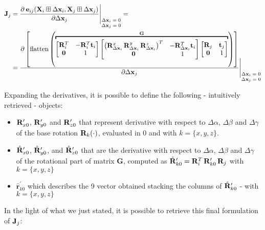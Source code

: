 \begin{align*}
    \jacob_j &= \frac{\partial\: \error_{ij}(\SState_i \boxplus \dx_i, \SState_j \boxplus \dx_j)}{\partial \dx_j} \Bigg \rvert_{\scriptsize\begin{matrix} \dx_i = 0\\\dx_j = 0\end{matrix}} = \\
    &= \frac{\partial \left[\flatten{\overbracket{\begin{bmatrix}\rot_i^T & -\rot_i^T \trans_i \\\zero & 1\end{bmatrix} \begin{bmatrix}\left(\rot_{\dx_i}^x \, \rot_{\dx_i}^y \, \rot_{\dx_i}^z\right)^T & -\rot_{\dx_i}^T \trans_i \\\zero & 1\end{bmatrix} \begin{bmatrix}\rot_j & \trans_j \\\zero & 1\end{bmatrix}}^{\mathbf{G}}}\right]}{\partial \dx_j} \Bigg \rvert_{\scriptsize\begin{matrix} \dx_i = 0\\\dx_j = 0\end{matrix}} 
\end{align*}

\noindent Expanding the derivatives, it is possible to define the following - intuitively retrieved - objects:

\begin{itemize}
    \item  $\mathbf{R}_{x0}^{\prime}$, $\mathbf{R}_{y0}^{\prime}$ and $\mathbf{R}_{z0}^{\prime}$ that represent derivative with respect to $\Delta\alpha$, $\Delta\beta$ and $\Delta\gamma$ of the base rotation $\mathbf{R}_k(\cdot)$, evaluated in 0 and with $k = \{x,y,z\}$.
    \item  $\hat{\mathbf{R}}_{x0}^{\prime}$, $\hat{\mathbf{R}}_{y0}^{\prime}$, and $\hat{\mathbf{R}}_{z0}^{\prime}$ that are the derivative with respect to $\Delta\alpha$, $\Delta\beta$ and $\Delta\gamma$ of the rotational part of matrix $\mathbf{G}$, computed as $\hat{\mathbf{R}}_{k0}^{\prime} = \mathbf{R}_{i}^T \, \mathbf{R}_{k0}^{\prime} \, \mathbf{R}_j$ with $k = \{x,y,z\}$
    \item $\hat{\mathbf{r}}_{k0}^{\prime}$ which describes the 9 vector obtained stacking the columns of $\hat{\mathbf{R}}_{k0}^{\prime}$ - with $k = \{x,y,z\}$
\end{itemize}

\noindent In the light of what we just stated, it is possible to retrieve this final formulation of $\mathbf{J}_j$:

